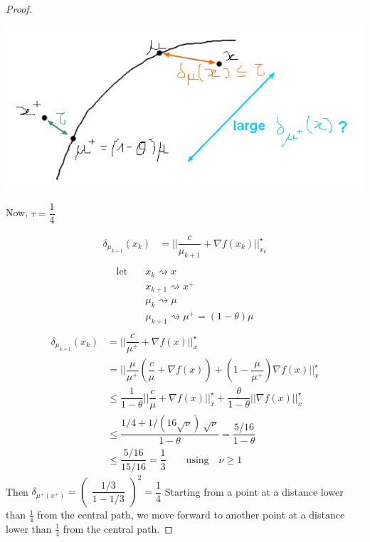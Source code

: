 \begin{proof}
\begin{center}
\includegraphics[scale=0.5]{images/12-fig3.jpg} 
\end{center}

Now, $\tau = \dfrac{1}{4}$

\begin{align*}\nonumber
\delta_{\mu_{k+1}}(x_k) &= || \dfrac{c}{\mu_{k+1}} + \nabla f(x_k) ||_{x_k}^{\star} \\ 
\end{align*}
\begin{align*}\nonumber
\text{let} &\quad x_k \rightsquigarrow x\\
&\quad x_{k+1} \rightsquigarrow x^+\\
&\quad \mu_k \rightsquigarrow \mu\\
&\quad \mu_{k+1} \rightsquigarrow \mu^+ = (1-\theta)\mu\\
\end{align*}
\begin{align*}\nonumber
\delta_{\mu_{k+1}}(x_k) &= || \dfrac{c}{\mu^{+}} + \nabla f(x) ||_x^{\star} \\
& \nonumber = || \dfrac{\mu}{\mu^{+}} (\dfrac{c}{\mu} + \nabla f(x)) + (1 - \dfrac{\mu}{\mu^+}) \nabla f(x) ||_x^{\star} \\
& \nonumber \leq \dfrac{1}{1 - \theta} || \dfrac{c}{\mu} + \nabla f(x) ||_x^{\star} + \dfrac{\theta}{1 - \theta} || \nabla f(x) ||_x^{\star} \\
& \nonumber \leq \dfrac{1/4 + 1/(16\sqrt{\nu})  ~ \sqrt{\nu}}{1 - \theta} = \dfrac{5/16}{1 - \theta} \\
& \nonumber \leq \dfrac{5/16}{15/16} = \dfrac{1}{3} \qquad \text{using} \quad \nu \geq 1
\end{align*}
Then $\delta_{\mu^+(x^+)} = \begin{pmatrix}
\dfrac{1/3}{1 - 1/3}
\end{pmatrix}^2 
= \dfrac{1}{4}$
Starting from a point at a distance lower than $\frac{1}{4}$ from the central path, we move forward to another point at a distance lower than $\frac{1}{4}$ from the central path.

\end{proof}

%